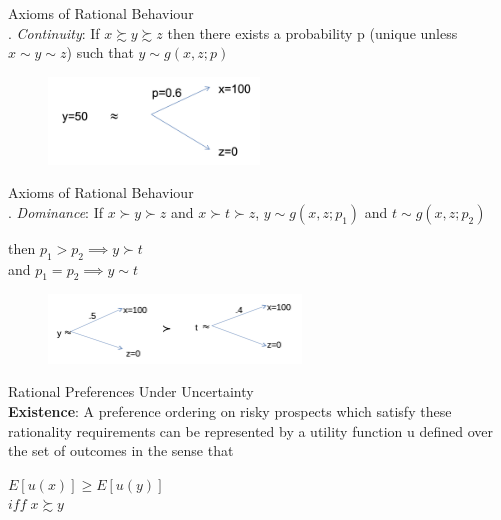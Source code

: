 \documentclass[
14pt,notheorems,hyperref={pdfauthor=whatever}
]{beamer}
\begin{document}
\begin{frame}
Axioms of Rational Behaviour\\
\hfill {}. \textit{Continuity}: If $x \succsim y \succsim z$ then there exists a probability p (unique unless $x \sim y \sim z$) such that $y \sim g(x,z;p)$\\
\begin{figure}[ut4]
    \includegraphics[width=0.5\textwidth]{L1UT4}
    \centering
\end{figure}
\end{frame}

\begin{frame}
Axioms of Rational Behaviour\\
\hfill {}. \textit{Dominance}: If $x \succ y \succ z$ and $x \succ t \succ z$, $y \sim g(x,z;p_1)$ and $t \sim g(x,z;p_2)$\\
\begin{center}
    then $p_1 > p_2 \implies y \succ t$\\
    and $p_1 = p_2 \implies y \sim t$\\
\end{center}
\begin{figure}[ut5]
    \includegraphics[width=0.6\textwidth]{L1UT5}
    \centering
\end{figure}
\end{frame}

\begin{frame}
Rational Preferences Under Uncertainty\\
\hfill \break
\textbf{Existence}: A preference ordering on risky prospects which satisfy these rationality requirements can be represented by a utility function u defined over the set of outcomes in the sense that\\
\hfill \break
\begin{center}
    $E[u(x)] \geq E[u(y)]$\\
    $iff\;x \succsim y$\\
\end{center}
\end{frame}
\end{document}
